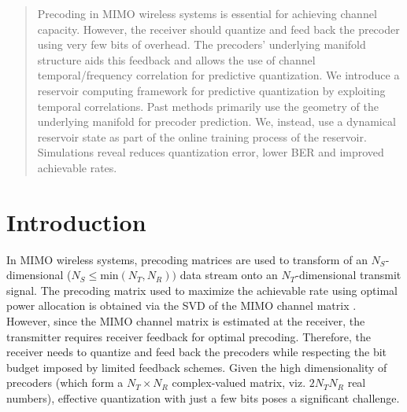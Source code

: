 \documentclass[conference]{IEEEtran}
\begin{document}
\begin{abstract}


  Precoding in MIMO wireless systems is essential for achieving
  channel capacity. However, the receiver should quantize and feed
  back the precoder using very few bits of overhead. The precoders'
  underlying manifold structure aids this feedback and allows the use
  of channel temporal/frequency correlation for predictive
  quantization. We introduce a reservoir computing framework for
  predictive quantization by exploiting temporal correlations. Past
  methods primarily use the geometry of the underlying manifold for
  precoder prediction.  We, instead, use a dynamical reservoir state
  as part of the online training process of the reservoir.
  Simulations reveal reduces quantization error, lower BER and
  improved achievable rates.
\end{abstract}


\vspace{-5pt}
\section{Introduction}
\label{intro}
In MIMO wireless systems, precoding matrices are used to transform of an $N_S$-dimensional ($N_S \leq \text{min}(N_T,N_R))$ data stream onto an $N_T$-dimensional transmit signal.
The precoding matrix used to maximize the achievable rate using optimal power allocation is obtained via the SVD of the MIMO channel matrix \cite{love2008overview}.
However, since the MIMO channel matrix is estimated at the receiver, the transmitter requires receiver feedback for optimal precoding.
Therefore, the receiver needs to quantize and feed back the precoders while respecting the bit budget imposed by limited feedback schemes.
Given the high dimensionality of precoders (which form a $N_T \times N_R$ complex-valued matrix, viz. $2N_TN_R$ real numbers), effective quantization with just a few bits poses a significant challenge.
\end{document}
